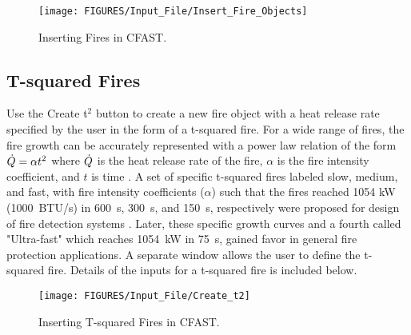 \begin{figure}[h!]
\begin{center}
\texttt{[image: FIGURES/Input\_File/Insert\_Fire\_Objects]}
\caption[Inserting Fires in CFAST]{Inserting Fires in CFAST.}
\end{center}
\end{figure}

\subsection{T-squared Fires}

Use the Create t$^2$ button to create a new fire object with a heat release rate specified by the user in the form of a t-squared fire.  For a wide range of fires, the fire growth can be accurately represented with a power law relation of the form $\dot{Q}=\alpha t^2$  where $\dot{Q}$  is the heat release rate of the fire, $\alpha$ is the fire intensity coefficient, and $t$ is time \cite{Schifiliti:2002}. A set of specific t-squared fires labeled slow, medium, and fast, with fire intensity coefficients ($\alpha$) such that the fires reached 1054 kW (1000~BTU/s) in 600~s, 300~s, and 150~s, respectively were proposed for design of fire detection systems .  Later, these specific growth curves and a fourth called "Ultra-fast" which reaches 1054~kW in 75~s, gained favor in general fire protection applications. A separate window allows the user to define the t-squared fire. Details of the inputs for a t-squared fire is included below.

\begin{figure}[h!]
\begin{center}
\texttt{[image: FIGURES/Input\_File/Create\_t2]}
\caption[Inserting T-squared Fires in CFAST]{Inserting T-squared Fires in CFAST.}
\end{center}
\end{figure}

